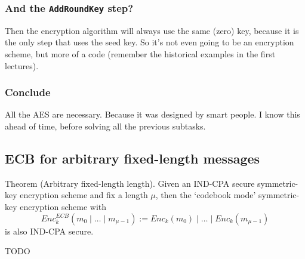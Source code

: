 \documentclass{article}
\begin{document}
  \subsubsection{And the \texttt{AddRoundKey} step?}
  Then the encryption algorithm will always use the same (zero) key, because it is the only step that uses the seed key.
  So it's not even going to be an encryption scheme, but more of a code (remember the historical examples in the first lectures).

  \subsubsection{Conclude}
  All the AES are necessary.
  Because it was designed by smart people.
  I know this ahead of time, before solving all the previous subtasks.

  \subsection{ECB for arbitrary fixed-length messages}
  \begin{centerframebox}
    Theorem (Arbitrary fixed-length length). Given an IND-CPA secure symmetric-key encryption scheme and fix a length $\mu$, then the `codebook mode' symmetric-key encryption scheme with
    \[ Enc^{ECB}_k (m_0 \mid \dots \mid m_{\mu-1}) := Enc_k(m_0) \mid \dots \mid Enc_k(m_{\mu-1})\]
    is also IND-CPA secure.
  \end{centerframebox}
  TODO
\end{document}
